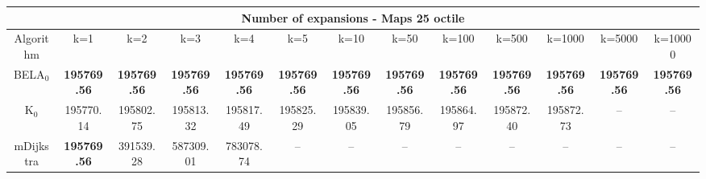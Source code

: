 \begin{tabular}{c|cccccccccccc}\toprule
\multicolumn{13}{c}{Number of expansions - Maps 25 octile}\\ \midrule
Algorithm & k=1 & k=2 & k=3 & k=4 & k=5 & k=10 & k=50 & k=100 & k=500 & k=1000 & k=5000 & k=10000 \\ \midrule
BELA$_0$ & \textbf{195769.56} & \textbf{195769.56} & \textbf{195769.56} & \textbf{195769.56} & \textbf{195769.56} & \textbf{195769.56} & \textbf{195769.56} & \textbf{195769.56} & \textbf{195769.56} & \textbf{195769.56} & \textbf{195769.56} & \textbf{195769.56} \\
K$_0$ & 195770.14 & 195802.75 & 195813.32 & 195817.49 & 195825.29 & 195839.05 & 195856.79 & 195864.97 & 195872.40 & 195872.73 & -- & -- \\
mDijkstra & \textbf{195769.56} & 391539.28 & 587309.01 & 783078.74 & -- & -- & -- & -- & -- & -- & -- & -- \\ \bottomrule 
\end{tabular}
